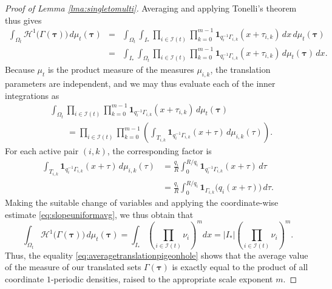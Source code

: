 \documentclass[12pt]{amsart}
\numberwithin{equation}{section}
\begin{document}
\begin{proof}[Proof of Lemma \ref{lma:singletomulti}]
Averaging and applying Tonelli's theorem thus gives
\begin{eqnarray*}
\int_{\Omega_t}
\mathcal H^1\bigl(\Gamma(\boldsymbol{\tau})\bigr)
\,d\mu_t(\boldsymbol{\tau})
& = &
\int_{\Omega_t}
\int_{I_*}
\prod_{i\in\mathcal I(t)}
\prod_{k=0}^{m-1}
\mathbf 1_{q_i^{-1}\Gamma_{i,k}}
      (x+\tau_{i,k})
\,dx\,d\mu_t(\boldsymbol{\tau})\\
& = &
\int_{I_*}
\int_{\Omega_t}
\prod_{i\in\mathcal I(t)}
\prod_{k=0}^{m-1}
\mathbf 1_{q_i^{-1}\Gamma_{i,k}}
      (x+\tau_{i,k})
\,d\mu_t(\boldsymbol{\tau})\,dx.
\end{eqnarray*}
Because $\mu_t$ is the product measure of the measures $\mu_{i,k}$, the translation parameters are independent, and we may thus evaluate each of the inner integrations as
\begin{align*}
&\int_{\Omega_t}
\prod_{i\in\mathcal I(t)}
\prod_{k=0}^{m-1}
\mathbf 1_{q_i^{-1}\Gamma_{i,k}}
      (x+\tau_{i,k})
\,d\mu_t(\boldsymbol{\tau})\\
&\qquad=
\prod_{i\in\mathcal I(t)}
\prod_{k=0}^{m-1}
\left(
\int_{T_{i,k}}
\mathbf 1_{q_i^{-1}\Gamma_{i,k}}(x+\tau)
\,d\mu_{i,k}(\tau)
\right).
\end{align*}
For each active pair $(i,k)$, the corresponding factor is
\begin{align*}
\int_{T_{i,k}}
\mathbf 1_{q_i^{-1}\Gamma_{i,k}}(x+\tau)
\,d\mu_{i,k}(\tau)
&=
\frac{q_i}{R}
\int_0^{R/q_i}
\mathbf 1_{q_i^{-1}\Gamma_{i,k}}(x+\tau)\,d\tau\\
&=
\frac{q_i}{R}
\int_0^{R/q_i}
\mathbf 1_{\Gamma_{i,k}}
       \bigl(q_i(x+\tau)\bigr)\,d\tau.
\end{align*}
Making the suitable change of variables and applying the coordinate-wise estimate \eqref{eq:slopeuniformavg}, we thus obtain that
\begin{equation}\label{eq:averagetranslationpigeonhole}
\int_{\Omega_t}
\mathcal H^1\bigl(\Gamma(\boldsymbol{\tau})\bigr)
\,d\mu_t(\boldsymbol{\tau})
=
\int_{I_*}
\left(
\prod_{i\in\mathcal I(t)}\nu_i
\right)^m dx =
|I_*|
\left(
\prod_{i\in\mathcal I(t)}\nu_i
\right)^m.
\end{equation}
Thus, the equality \eqref{eq:averagetranslationpigeonhole} shows that the average value of the measure of our translated sets $\Gamma (\bm{\tau})$ is exactly equal to the product of all coordinate $1$-periodic densities, raised to the appropriate scale exponent $m$.


\end{proof}
\end{document}

